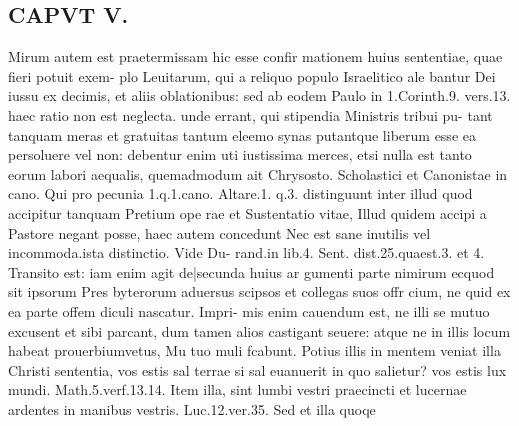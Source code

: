 \documentclass{article}
\begin{document}
\begin{pages}
\section*{CAPVT V. }
\marginpar{[ p.311 ]}Mirum autem est praetermissam hic esse confir mationem huius sententiae, quae fieri potuit exem- plo Leuitarum, qui a reliquo populo Israelitico ale bantur Dei iussu ex decimis, et aliis oblationibus: sed ab eodem Paulo in 1.Corinth.9. vers.13. haec ratio non est neglecta. unde errant, qui stipendia Ministris tribui pu- tant tanquam meras et gratuitas tantum eleemo synas putantque liberum esse ea persoluere vel non: debentur enim uti iustissima merces, etsi nulla est tanto eorum labori aequalis, quemadmodum ait Chrysosto. Scholastici et Canonistae in cano. Qui pro pecunia 1.q.1.cano. Altare.1. q.3. distinguunt inter illud quod accipitur tanquam Pretium ope rae et Sustentatio vitae, Illud quidem accipi a Pastore negant posse, haec autem concedunt Nec est sane inutilis vel incommoda.ista distinctio. Vide Du- rand.in lib.4. Sent. dist.25.quaest.3. et 4.   Transito est: iam enim agit de|secunda huius ar gumenti parte nimirum ecquod sit ipsorum Pres byterorum aduersus scipsos et collegas suos offr cium, ne quid ex ea parte offem diculi nascatur. Impri- mis enim cauendum est, ne illi se mutuo excusent et sibi parcant, dum tamen alios castigant seuere: atque ne in illis locum habeat prouerbiumvetus, Mu tuo muli fcabunt. Potius illis in mentem veniat illa Christi sententia, vos estis sal terrae si sal euanuerit in quo salietur? vos estis lux mundi. Math.5.verf.13.14. Item illa, sint lumbi vestri praecincti et lucernae ardentes in manibus vestris. Luc.12.ver.35. Sed et illa quoqe 

\end{pages}
\end{document}
